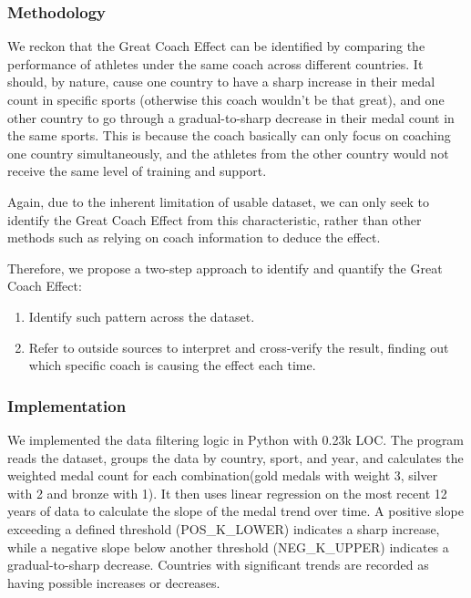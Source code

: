 \documentclass{mcmthesis}
\begin{document}
\subsubsection{Methodology}

We reckon that the Great Coach Effect can be identified by comparing the performance of athletes under the same coach across different countries. It should, by nature, cause one country to have a sharp increase in their medal count in specific sports (otherwise this coach wouldn't be that great), and one other country to go through a gradual-to-sharp decrease in their medal count in the same sports. This is because the coach basically can only focus on coaching one country simultaneously, and the athletes from the other country would not receive the same level of training and support.

Again, due to the inherent limitation of usable dataset, we can only seek to identify the Great Coach Effect from this characteristic, rather than other methods such as relying on coach information to deduce the effect.

Therefore, we propose a two-step approach to identify and quantify the Great Coach Effect:

\begin{enumerate}
    \item Identify such pattern across the dataset.
    \item Refer to outside sources to interpret and cross-verify the result, finding out which specific coach is causing the effect each time.
\end{enumerate}

\subsubsection{Implementation}

We implemented the data filtering logic in Python with 0.23k LOC. The program reads the dataset, groups the data by country, sport, and year, and calculates the weighted medal count for each combination(gold medals with weight 3, silver with 2 and bronze with 1). It then uses linear regression on the most recent 12 years of data to calculate the slope of the medal trend over time. A positive slope exceeding a defined threshold (POS\_K\_LOWER) indicates a sharp increase, while a negative slope below another threshold (NEG\_K\_UPPER) indicates a gradual-to-sharp decrease. Countries with significant trends are recorded as having possible increases or decreases.
\end{document}
